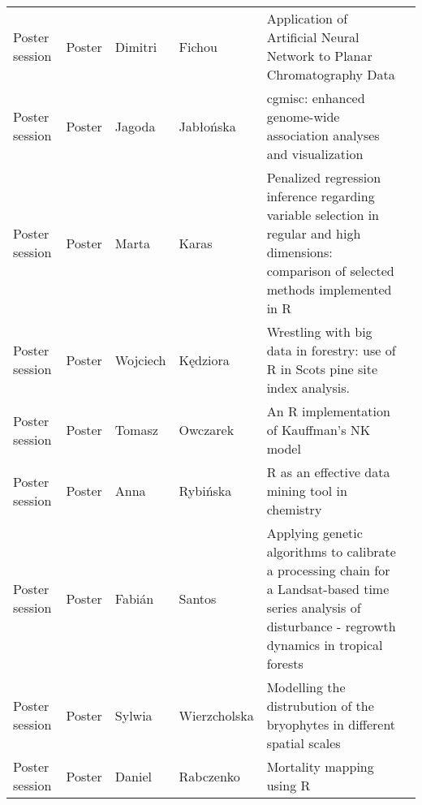 \begin{longtable}{|p{2.6cm}|p{1.8cm}|p{1.9cm}|p{2.2cm}|p{9cm}|p{2.5cm}|}
  Poster session & Poster & Dimitri & Fichou & Application of Artificial Neural Network to Planar Chromatography Data &  \\ 
  Poster session & Poster & Jagoda & Jabłońska & cgmisc: enhanced genome-wide association analyses and visualization &  \\ 
  Poster session & Poster & Marta & Karas & Penalized regression inference regarding variable selection in regular and high dimensions: comparison of selected methods implemented in R &  \\ 
  Poster session & Poster & Wojciech & Kędziora & Wrestling with big data in forestry: use of R in Scots pine site index analysis. &  \\ 
  Poster session & Poster & Tomasz & Owczarek & An R implementation of Kauffman's NK model &  \\ 
  Poster session & Poster & Anna & Rybińska & R as an effective data mining tool in chemistry &  \\ 
  Poster session & Poster & Fabián & Santos & Applying genetic algorithms to calibrate a processing chain for a Landsat-based time series analysis of disturbance - regrowth dynamics in tropical forests &  \\ 
  Poster session & Poster & Sylwia & Wierzcholska & Modelling the distrubution of the bryophytes in different spatial scales &  \\ 
  Poster session & Poster & Daniel & Rabczenko & Mortality mapping using R &  \\ 
   \hline
\hline
\end{longtable}
\endgroup

